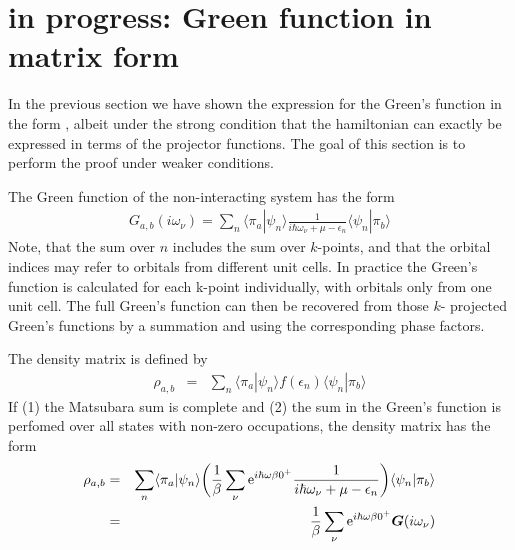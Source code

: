 \documentclass[11pt,a4paper]{report}
\begin{document}
\chapter{in progress: Green function in matrix form}
\label{sec:Greenmatrix}
In the previous section we have shown the expression for the Green's
function in the form , albeit under the strong
condition that the hamiltonian can exactly be expressed in terms of
the projector functions. The goal of this section is to perform the
proof under weaker conditions.

The Green function of the non-interacting system has the form
\begin{eqnarray}
G_{a,b}(i\omega_\nu)
=\sum_n\langle\pi_a|\psi_n\rangle\frac{1}{i\hbar\omega_\nu+\mu-\epsilon_n}
\langle\psi_n|\pi_b\rangle
\label{eq:greenmatrix1a}
\end{eqnarray}
Note, that the sum over $n$ includes the sum over $k$-points, and that
the orbital indices may refer to orbitals from different unit
cells. In practice the Green's function is calculated for each k-point
individually, with orbitals only from one unit cell. The full Green's
function can then be recovered from those $k$- projected Green's
functions by a summation and using the corresponding
phase factors.

The density matrix is defined by
\begin{eqnarray}
\rho_{a,b}&=&\sum_{n}\langle\pi_a|\psi_n\rangle
 f(\epsilon_n)\langle\psi_n|\pi_b\rangle
\end{eqnarray}
If (1) the Matsubara sum is complete and (2) the sum in the Green's
function is perfomed over all states with non-zero occupations, the
density matrix has the form
\begin{eqnarray}
\rho_{a,b}&=&\sum_n\langle\pi_a|\psi_n\rangle\biggl(
 \frac{1}{\beta}\sum_\nu\mathrm{e}^{i\hbar\omega\beta0^+}
\frac{1}{i\hbar\omega_\nu+\mu-\epsilon_n}
\biggr)
\langle\psi_n|\pi_b\rangle
\nonumber\\
&=&\frac{1}{\beta}\sum_\nu\mathrm{e}^{i\hbar\omega\beta0^+}\bm{G}(i\omega_\nu)
\end{eqnarray}
\end{document}
